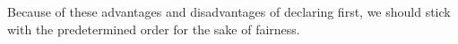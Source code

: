 \bigskip
Because of these advantages and disadvantages of declaring first, we should stick with the predetermined order for the sake of fairness. 

\newpage

